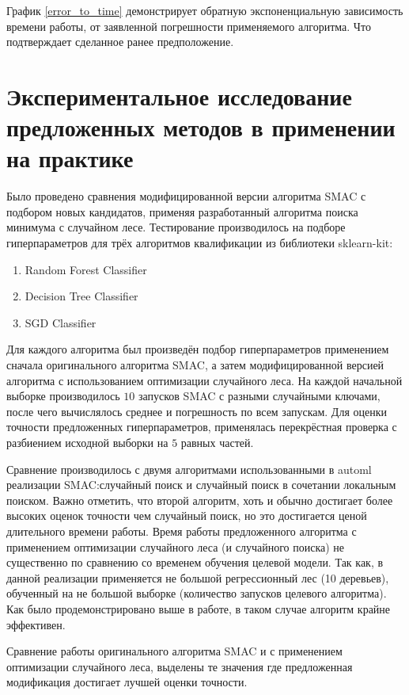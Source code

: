 График \cref{error_to_time} демонстрирует обратную экспоненциальную зависимость
времени работы, от заявленной погрешности применяемого алгоритма. Что
подтверждает сделанное ранее предположение.

\section{Экспериментальное исследование предложенных методов в применении на
практике}\label{sec:test_smac}

Было проведено сравнения модифицированной версии алгоритма SMAC с подбором новых
кандидатов, применяя разработанный алгоритма поиска минимума с случайном лесе.
Тестирование производилось на подборе гиперпараметров для трёх алгоритмов
квалификации из библиотеки sklearn-kit:

\begin{enumerate}
    \item Random Forest Classifier
    \item Decision Tree Classifier
    \item SGD Classifier
\end{enumerate}

Для каждого алгоритма был произведён подбор гиперпараметров применением сначала
оригинального алгоритма SMAC, а затем модифицированной версией алгоритма
с использованием оптимизации случайного леса. На каждой начальной выборке
производилось $10$ запусков SMAC с разными случайными ключами, после чего
вычислялось среднее и погрешность по всем запускам. Для оценки точности
предложенных гиперпараметров, применялась перекрёстная проверка с разбиением
исходной выборки на $5$ равных частей.

Сравнение производилось с двумя алгоритмами использованными в automl реализации
SMAC:\@ случайный поиск и случайный поиск в сочетании локальным поиском. Важно
отметить, что второй алгоритм, хоть и обычно достигает более высоких оценок
точности чем случайный поиск, но это достигается ценой длительного времени
работы. Время работы предложенного алгоритма с применением оптимизации
случайного леса (и случайного поиска) не существенно по сравнению со временем
обучения целевой модели. Так как, в данной реализации применяется не большой
регрессионный лес (10 деревьев), обученный на не большой выборке (количество
запусков целевого алгоритма). Как было продемонстрировано выше в работе, в таком
случае алгоритм крайне эффективен.

\begin{table}[H]
\centering
\caption{Сравнение работы оригинального алгоритма SMAC и с применением оптимизации
случайного леса, выделены те значения где предложенная модификация достигает
лучшей оценки точности.}\label{smacgeneral}
\smacgeneral
\end{table}

